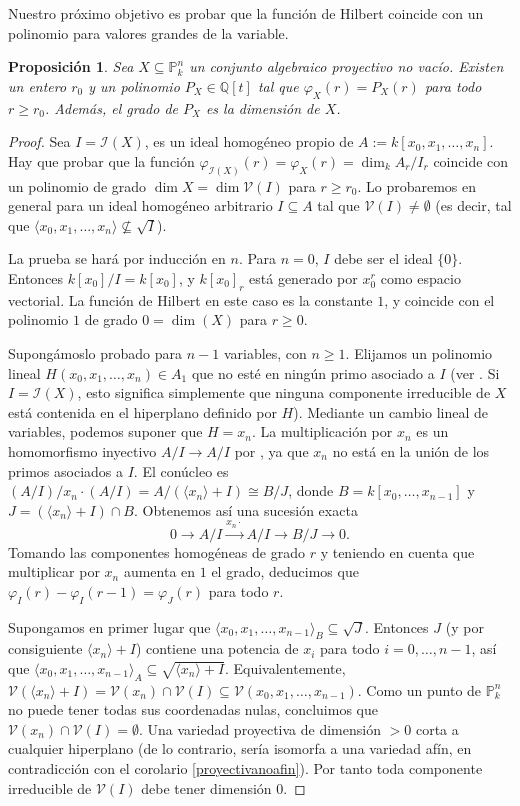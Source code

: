 \documentclass[a4paper,10pt]{book}
\newtheorem{prop}[thm]{Proposición}
\newcommand{\PP}{\mathbb P}
\newcommand{\Pnk}{\PP^n_k}
\newcommand{\II}{{\mathcal I}}
\newcommand{\VV}{{\mathcal V}}
\begin{document}
Nuestro próximo objetivo es probar que la función de Hilbert coincide con un polinomio para valores grandes de la variable.

\begin{prop}\label{existepolinomio}
Sea $X\subseteq\Pnk$ un conjunto algebraico proyectivo no vacío. Existen un entero $r_0$ y un polinomio $P_X\in {\mathbb Q}[t]$ tal que $\varphi_X(r)=P_X(r)$ para todo $r\geq r_0$. Además, el grado de $P_X$ es la dimensión de $X$.
\end{prop}

\begin{proof}
Sea $I=\II(X)$, es un ideal homogéneo propio de $A:=k[x_0,x_1,\ldots,x_n]$. Hay que probar que la función $\varphi_{\II(X)}(r)=\varphi_X(r)=\dim_k A_r/I_r$ coincide con un polinomio de grado $\dim X=\dim\VV(I)$ para $r\geq r_0$. Lo probaremos en general para un ideal homogéneo arbitrario $I\subseteq A$ tal que $\VV(I)\neq\emptyset$ (es decir, tal que $\langle x_0,x_1,\ldots,x_n\rangle\not\subseteq \sqrt{I}$).

 La prueba se hará por inducción en $n$. Para $n=0$, $I$ debe ser el ideal $\{0\}$. Entonces $k[x_0]/I=k[x_0]$, y $k[x_0]_r$ está generado por $x_0^r$ como espacio vectorial. La función de Hilbert en este caso es la constante $1$, y coincide con el polinomio $1$ de grado $0=\dim(X)$ para $r\geq 0$.

Supongámoslo probado para $n-1$ variables, con $n\geq 1$. Elijamos un polinomio lineal $H(x_0,x_1,\ldots,x_n)\in A_1$ que no esté en ningún primo asociado a $I$ (ver \cite[Capítulo 4]{am}. Si $I=\II(X)$, esto significa simplemente que ninguna componente irreducible de $X$ está contenida en el hiperplano definido por $H$). Mediante un cambio lineal de variables, podemos suponer que $H=x_n$. La multiplicación por $x_n$ es un homomorfismo inyectivo $A/I\to A/I$ por \cite[Proposición 4.7]{am}, ya que $x_n$ no está en la unión de los primos asociados a $I$. El conúcleo es $(A/I)/x_n\cdot(A/I)=A/(\langle x_n\rangle +I)\cong B/J$, donde $B=k[x_0,\ldots,x_{n-1}]$ y $J=(\langle x_n\rangle +I)\cap B$. Obtenemos así una sucesión exacta
$$
0\to A/I\stackrel{x_n\cdot}{\to} A/I \to B/J\to 0.
$$
Tomando las componentes homogéneas de grado $r$ y teniendo en cuenta que multiplicar por $x_n$ aumenta en $1$ el grado, deducimos que $\varphi_I(r)-\varphi_I(r-1)=\varphi_J(r)$ para todo $r$.

Supongamos en primer lugar que $\langle x_0,x_1,\ldots,x_{n-1}\rangle_B\subseteq \sqrt{J}$. Entonces $J$ (y por consiguiente $\langle x_n\rangle +I$) contiene una potencia de $x_i$ para todo $i=0,\ldots,n-1$, así que $\langle x_0,x_1,\ldots,x_{n-1}\rangle_A\subseteq \sqrt{\langle x_n\rangle +I}$. Equivalentemente, $\VV(\langle x_n\rangle +I)=\VV(x_n)\cap\VV(I)\subseteq\VV(x_0,x_1,\ldots,x_{n-1})$. Como un punto de $\Pnk$ no puede tener todas sus coordenadas nulas, concluimos que $\VV(x_n)\cap\VV(I)=\emptyset$. Una variedad proyectiva de dimensión $>0$ corta a cualquier hiperplano (de lo contrario, sería isomorfa a una variedad afín, en contradicción con el corolario \ref{proyectivanoafin}). Por tanto toda componente irreducible de $\VV(I)$ debe tener dimensión $0$.


\end{proof}
\end{document}
